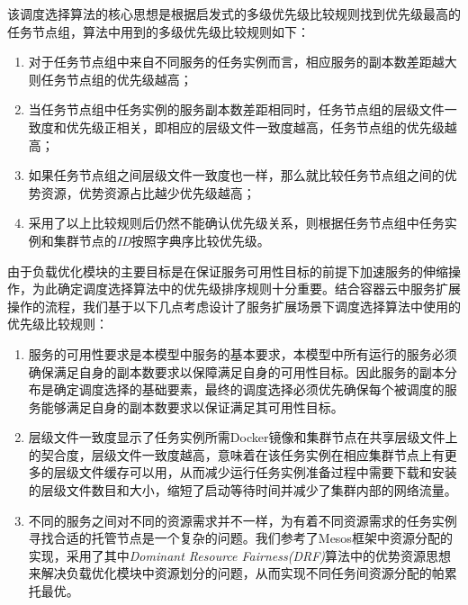 该调度选择算法的核心思想是根据启发式的多级优先级比较规则找到优先级最高的任务节点组，算法中用到的多级优先级比较规则如下：
\begin{enumerate}
\item 对于任务节点组中来自不同服务的任务实例而言，相应服务的副本数差距越大则任务节点组的优先级越高；
\item 当任务节点组中任务实例的服务副本数差距相同时，任务节点组的层级文件一致度和优先级正相关，即相应的层级文件一致度越高，任务节点组的优先级越高；
\item 如果任务节点组之间层级文件一致度也一样，那么就比较任务节点组之间的优势资源，优势资源占比越少优先级越高；
\item 采用了以上比较规则后仍然不能确认优先级关系，则根据任务节点组中任务实例和集群节点的\emph{ID}按照字典序比较优先级。
\end{enumerate}

由于负载优化模块的主要目标是在保证服务可用性目标的前提下加速服务的伸缩操作，为此确定调度选择算法中的优先级排序规则十分重要。结合容器云中服务扩展操作的流程，我们基于以下几点考虑设计了服务扩展场景下调度选择算法中使用的优先级比较规则：
\begin{enumerate}
\item 服务的可用性要求是本模型中服务的基本要求，本模型中所有运行的服务必须确保满足自身的副本数要求以保障满足自身的可用性目标。因此服务的副本分布是确定调度选择的基础要素，最终的调度选择必须优先确保每个被调度的服务能够满足自身的副本数要求以保证满足其可用性目标。
\item 层级文件一致度显示了任务实例所需Docker镜像和集群节点在共享层级文件上的契合度，层级文件一致度越高，意味着在该任务实例在相应集群节点上有更多的层级文件缓存可以用，从而减少运行任务实例准备过程中需要下载和安装的层级文件数目和大小，缩短了启动等待时间并减少了集群内部的网络流量。
\item 不同的服务之间对不同的资源需求并不一样，为有着不同资源需求的任务实例寻找合适的托管节点是一个复杂的问题。我们参考了Mesos框架中资源分配的实现，采用了其中\emph{Dominant Resource Fairness(DRF)}算法中的优势资源思想来解决负载优化模块中资源划分的问题，从而实现不同任务间资源分配的帕累托最优\cite{ghodsi2011dominant}。
\end{enumerate}

